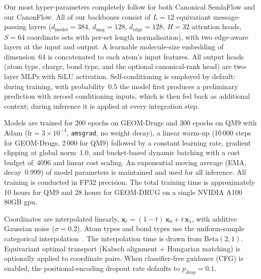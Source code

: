 \documentclass{article}
\theoremstyle{plain}
\theoremstyle{definition}
\theoremstyle{remark}
\newcommand{\1}{\mathbf{1}}
\begin{document}
Our most hyper-parameters completely follow \citet{irwin2024semlaflow} for both Canonical SemlaFlow and our CanonFlow. All of our backbones consist of $L{=}12$ equivariant message-passing layers
($d_\text{model}{=}384$, $d_\text{msg}{=}128$, $d_\text{edge}{=}128$,
$H{=}32$ attention heads, $S{=}64$ coordinate sets with per-set length normalisation), with two edge-aware layers at the input and output.
A learnable molecule-size embedding of dimension~64 is concatenated to each atom's input features.
All output heads (atom type, charge, bond type, and the optional canonical-rank head) are two-layer MLPs with SiLU activation. Self-conditioning is employed by default: during training, with probability~$0.5$ the model first produces a preliminary prediction with zeroed conditioning inputs, which is then fed back as additional context; during inference it is applied at every integration step.

Models are trained for 200 epochs on GEOM-Drugs and 300 epochs on QM9
with Adam ($\text{lr}{=}3{\times}10^{-4}$, \texttt{amsgrad}, no weight decay),
a linear warm-up (10\,000 steps for GEOM-Drugs, 2\,000 for QM9) followed by a constant learning rate,
gradient clipping at global norm~1.0,
and bucket-based dynamic batching with a cost budget of~4096 and linear cost scaling.
An exponential moving average (EMA, decay~$0.999$) of model parameters is maintained and used for all inference.
All training is conducted in FP32 precision. The total training time is approximately 10 hours for QM9 and 28 hours for GEOM-DRUG on a single NVIDIA A100 80GB gpu. 

Coordinates are interpolated linearly,
$\mathbf{x}_t = (1{-}t)\,\mathbf{x}_0 + t\,\mathbf{x}_1$,
with additive Gaussian noise ($\sigma{=}0.2$).
Atom types and bond types use the uniform-sample categorical interpolation~\cite{campbell2022discrete}.
The interpolation time is drawn from $\mathrm{Beta}(2,1)$.
Equivariant optimal transport (Kabsch alignment + Hungarian matching) is optionally applied to coordinate pairs.
When classifier-free guidance (CFG) is enabled, the positional-encoding dropout rate defaults to $p_{\text{drop}}{=}0.1$.
\end{document}
